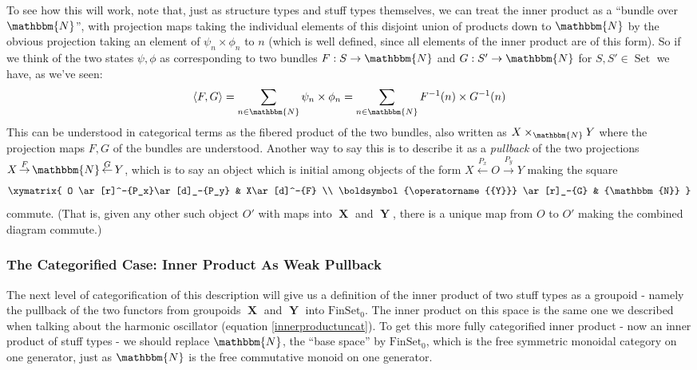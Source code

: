 \documentclass{amsart} \usepackage{amsmath,amssymb,bbm}
\newcommand{\opname}[1]{\operatorname{#1}}
\newcommand{\catname}[1]{\boldsymbol{\opname{{#1}}}}
\newcommand{\FSN}{\catname{FinSet_0}}
\newcommand{\inprod}[1]{\left\langle{#1}\right\rangle}
\newcommand{\rightarrowlim}{\mathop{\rightarrow}\limits}
\newcommand{\leftarrowlim}{\mathop{\leftarrow}\limits}
\begin{document}
To see how this will work, note that, just as structure types and
stuff types themselves, we can treat the inner product as a ``bundle
over $\mathbbm{N}$'', with projection maps taking the individual
elements of this disjoint union of products down to $\mathbbm{N}$ by
the obvious projection taking an element of $\psi_n \times \phi_n$ to
$n$ (which is well defined, since all elements of the inner product
are of this form).  So if we think of the two states $\psi,
\phi$ as corresponding to two bundles $F : S \rightarrow \mathbbm{N}$ and $G :
S' \rightarrow \mathbbm{N}$ for $S, S' \in \opname{Set}$ we have, as
we've seen:
\begin{equation}
  \inprod{ F, G } = \sum_{n \in \mathbbm{N}} \psi_n \times
  \phi_n = \sum_{n \in \mathbbm{N}} F^{- 1} ( n ) \times G^{- 1} ( n )
\end{equation}
This can be understood in categorical terms as the fibered product of
the two bundles, also written as $X \times_{\mathbbm{N}} Y$ where the
projection maps $F, G$ of the bundles are understood.  Another way to
say this is to describe it as a {\textit{pullback}} of the two projections
$X \rightarrowlim^F \mathbbm{N} \leftarrowlim^G Y$, which is to say an
object which is initial among objects of the form $X
\leftarrowlim^{P_x} O \rightarrowlim^{P_y} Y$ making the square
\begin{equation}
 \xymatrix{
  O \ar[r]^-{P_x}\ar[d]_-{P_y} & X\ar[d]^-{F} \\
  \catname{Y} \ar[r]_-{G} & {\mathbbm{N}}
 }
\end{equation} commute.  (That is, given any other such object $O'$
with maps into $\catname{X}$ and $\catname{Y}$, there is a unique map from $O$ to $O'$
making the combined diagram commute.)

\subsubsection{The Categorified Case: Inner Product As Weak Pullback}
The next level of categorification of this description will give us a
definition of the inner product of two stuff types as a groupoid - namely the
pullback of the two functors from groupoids $\catname{X}$ and $\catname{Y}$ into
$\FSN$.   The inner product on this space is the same
one we described when talking about the harmonic oscillator (equation
\ref{innerproductuncat}).  To get this more fully categorified inner product -
now an inner product of stuff types - we should replace $\mathbbm{N}$,
the ``base space'' by $\FSN$, which is the free symmetric monoidal
category on one generator, just as $\mathbbm{N}$ is the free
commutative monoid on one generator.
\end{document}
